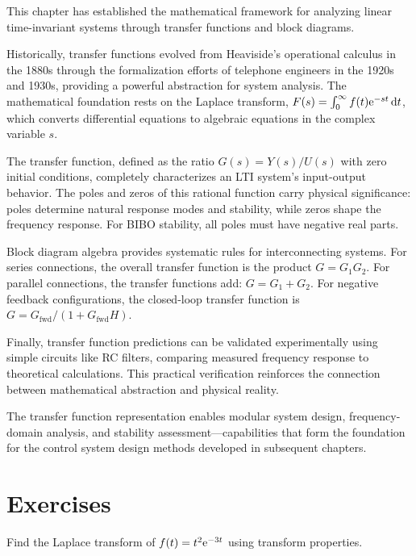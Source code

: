 This chapter has established the mathematical framework for analyzing linear time-invariant systems through transfer functions and block diagrams.

Historically, transfer functions evolved from Heaviside's operational calculus in the 1880s through the formalization efforts of telephone engineers in the 1920s and 1930s, providing a powerful abstraction for system analysis. The mathematical foundation rests on the Laplace transform, $F(s) = \int_0^\infty f(t)\mathrm{e}^{-st}\,\mathrm{d} t$, which converts differential equations to algebraic equations in the complex variable $s$.

The transfer function, defined as the ratio $G(s) = Y(s)/U(s)$ with zero initial conditions, completely characterizes an LTI system's input-output behavior. The poles and zeros of this rational function carry physical significance: poles determine natural response modes and stability, while zeros shape the frequency response. For BIBO stability, all poles must have negative real parts.

Block diagram algebra provides systematic rules for interconnecting systems. For series connections, the overall transfer function is the product $G = G_1 G_2$. For parallel connections, the transfer functions add: $G = G_1 + G_2$. For negative feedback configurations, the closed-loop transfer function is $G = G_{\text{fwd}}/(1 + G_{\text{fwd}}H)$.

Finally, transfer function predictions can be validated experimentally using simple circuits like RC filters, comparing measured frequency response to theoretical calculations. This practical verification reinforces the connection between mathematical abstraction and physical reality.

The transfer function representation enables modular system design, frequency-domain analysis, and stability assessment---capabilities that form the foundation for the control system design methods developed in subsequent chapters.

\newpage
\section{Exercises}
\label{sec:exercises}

\begin{exercise}
Find the Laplace transform of $f(t) = t^2\mathrm{e}^{-3t}$ using transform properties.
\end{exercise}

